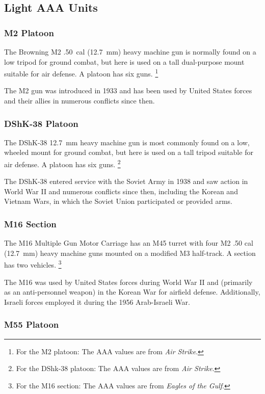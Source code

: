 \documentclass[10pt]{article}
\newcommand{\note}[1]{%
    \footnote{%
        \setlength{\parindent}{0pt}%
        \setlength{\parskip}{\smallskipamount}%
        #1
    }%
}
\begin{document}
\subsection{Light AAA Units}

\subsubsection{M2 Platoon}

The Browning M2 .50~cal (12.7~mm) heavy machine gun is normally found on a low tripod for ground combat, but here is used on a tall dual-purpose mount suitable for air defense. A platoon has six guns.%
\note{
    For the M2 platoon: The AAA values are from \emph{Air Strike}.
}

The M2 gun was introduced in 1933 and has been used by United States forces and their allies in numerous conflicts since then.

\subsubsection{DShK-38 Platoon}

The DShK-38 12.7~mm heavy machine gun is most commonly found on a low, wheeled mount for ground combat, but here is used on a tall tripod suitable for air defense. A platoon has six guns.%
\note{
    For the DShk-38 platoon: The AAA values are from \emph{Air Strike}.
}

The DShK-38 entered service with the Soviet Army in 1938 and saw action in World War II and numerous conflicts since then, including the Korean and Vietnam Wars, in which the Soviet Union participated or provided arms.

\subsubsection{M16 Section}

The M16 Multiple Gun Motor Carriage has an M45 turret with four M2 .50 cal (12.7~mm) heavy machine guns mounted on a modified M3 half-track. A section has two vehicles.%
\note{
    For the M16 section: The AAA values are from \emph{Eagles of the Gulf}.
}

The M16 was used by United States forces during World War II and (primarily as an anti-personnel weapon) in the Korean War for airfield defense. Additionally, Israeli forces employed it during the 1956 Arab-Israeli War.

\subsubsection{M55 Platoon}
\end{document}
